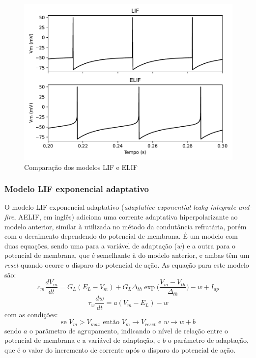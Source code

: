 \begin{figure}[tb]
	\centering
	\caption{Comparação dos modelos LIF e ELIF}
	\label{fig:elif}
	\includegraphics[width=0.7\linewidth]{figs/elif}
\end{figure}

\subsubsection{Modelo LIF exponencial adaptativo}
O modelo LIF exponencial adaptativo (\textit{adaptative exponential leaky integrate-and-fire}, AELIF, em inglês) adiciona uma corrente adaptativa hiperpolarizante ao modelo anterior, similar à utilizada no método da condutância refratária, porém com o decaimento dependendo do potencial de membrana. É um modelo com duas equações, sendo uma para a variável de adaptação ($w$) e a outra para o potencial de membrana, que é semelhante à do modelo anterior, e ambas têm um \textit{reset} quando ocorre o disparo do potencial de ação.
As equação para este modelo são:
\begin{equation}
	c_m\frac{dV_m}{dt} = G_L(E_L-V_m) + G_L\Delta_{th}\exp\Big(\frac{V_m-V_{th}}{\Delta_{th}}\Big) - w + I_{ap}
\end{equation}
\begin{equation}
	\tau_w\frac{dw}{dt}=a(V_m-E_L)-w
\end{equation}
com as condições:
\begin{equation}
	\text{se } V_m > V_{max} \text{ então } V_m\to V_{reset} \text{ e } w\to w + b
\end{equation}
sendo $a$ o parâmetro de agrupamento, indicando o nível de relação entre o potencial de membrana e a variável de adaptação, e $b$ o parâmetro de adaptação, que é o valor do incremento de corrente após o disparo do potencial de ação.

